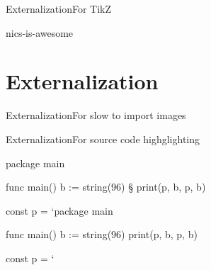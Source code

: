 \begin{slide}{Externalization}{For TikZ}
  \begin{nicscolumn}
    \begin{nicsextern}{nics-is-awesome}
    \end{nicsextern}
  \end{nicscolumn}
\end{slide}

\section{Externalization}

\begin{slide}{Externalization}{For slow to import images}
  \begin{nicscolumn}[3cm]
    \begin{nicsextern}{}
    \end{nicsextern}
  \end{nicscolumn}
\end{slide}

\begin{slide}{Externalization}{For source code highglighting}
  \begin{nicscolumn}
    \begin{nicsextern}[height=5.5cm]{}
      package main

      func main() {
        b := string(96)   §
        print(p, b, p, b)
      }

      const p = `package main

      func main() {
        b := string(96)
        print(p, b, p, b)
      }

      const p = `
    \end{nicsextern}
  \end{nicscolumn}
\end{slide}


